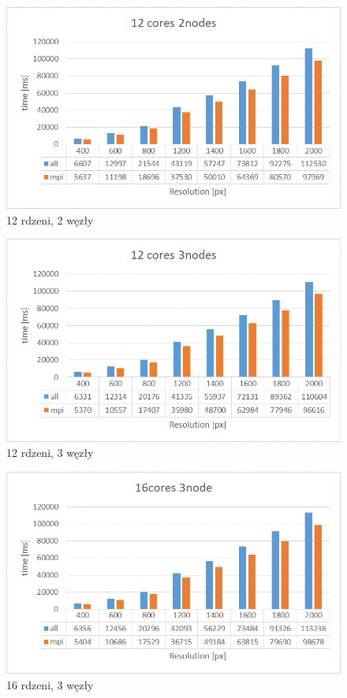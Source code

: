 \documentclass[a4paper]{article}
\begin{document}
\begin{figure}[H]
    \centering
    \includegraphics[width=\textwidth]{2-12c2n.png}
    \caption{12 rdzeni, 2 węzły}
    \label{fig:my_frac}
\end{figure}
\begin{figure}[H]
    \centering
    \includegraphics[width=\textwidth]{2-12c3n.png}
    \caption{12 rdzeni, 3 węzły}
    \label{fig:my_frac}
\end{figure}
\begin{figure}[H]
    \centering
    \includegraphics[width=\textwidth]{2-16c3n.png}
    \caption{16 rdzeni, 3 węzły}
    \label{fig:my_frac}
\end{figure}
\end{document}
